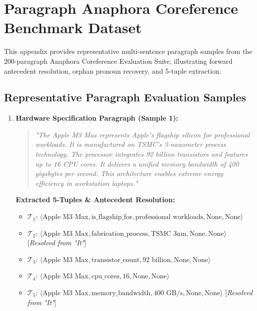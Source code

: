 \chapter{Paragraph Anaphora Coreference Benchmark Dataset}
\label{app:anaphora_dataset}

This appendix provides representative multi-sentence paragraph samples from the 200-paragraph Anaphora Coreference Evaluation Suite, illustrating forward antecedent resolution, orphan pronoun recovery, and 5-tuple extraction.

\section{Representative Paragraph Evaluation Samples}

\begin{enumerate}
    \item \textbf{Hardware Specification Paragraph (Sample 1):}
    \begin{quote}
        \textit{"The Apple M3 Max represents Apple's flagship silicon for professional workloads. It is manufactured on TSMC's 3-nanometer process technology. The processor integrates 92 billion transistors and features up to 16 CPU cores. It delivers a unified memory bandwidth of 400 gigabytes per second. This architecture enables extreme energy efficiency in workstation laptops."}
    \end{quote}
    \textbf{Extracted 5-Tuples \& Antecedent Resolution:}
    \begin{itemize}
        \item $\mathcal{T}_1$: $\langle \text{Apple M3 Max}, \text{is\_flagship\_for}, \text{professional workloads}, \text{None}, \text{None} \rangle$
        \item $\mathcal{T}_2$: $\langle \text{Apple M3 Max}, \text{fabrication\_process}, \text{TSMC 3nm}, \text{None}, \text{None} \rangle$ \hfill [\textit{Resolved from "It"}]
        \item $\mathcal{T}_3$: $\langle \text{Apple M3 Max}, \text{transistor\_count}, \text{92 billion}, \text{None}, \text{None} \rangle$
        \item $\mathcal{T}_4$: $\langle \text{Apple M3 Max}, \text{cpu\_cores}, \text{16}, \text{None}, \text{None} \rangle$
        \item $\mathcal{T}_5$: $\langle \text{Apple M3 Max}, \text{memory\_bandwidth}, \text{400 GB/s}, \text{None}, \text{None} \rangle$ \hfill [\textit{Resolved from "It"}]
    \end{itemize}


\end{enumerate}
